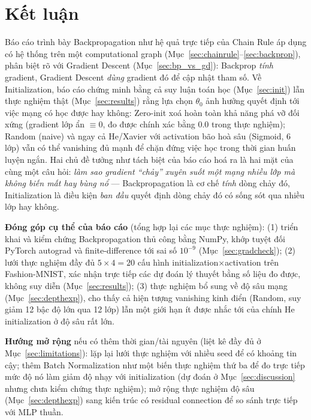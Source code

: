 \documentclass[12pt,a4paper]{article}
\begin{document}
\section{Kết luận}

Báo cáo trình bày Backpropagation như hệ quả trực tiếp của Chain Rule áp
dụng có hệ thống trên một computational graph (Mục~\ref{sec:chainrule}--\ref{sec:backprop}),
phân biệt rõ với Gradient Descent (Mục~\ref{sec:bp_vs_gd}): Backprop
\emph{tính} gradient, Gradient Descent \emph{dùng} gradient đó để cập nhật
tham số. Về Initialization, báo cáo chứng minh bằng cả suy luận toán học
(Mục~\ref{sec:init}) lẫn thực nghiệm thật (Mục~\ref{sec:results}) rằng lựa
chọn $\theta_0$ ảnh hưởng quyết định tới việc mạng có học được hay không:
Zero-init xoá hoàn toàn khả năng phá vỡ đối xứng (gradient lớp ẩn $\equiv0$,
đo được chính xác bằng $0.0$ trong thực nghiệm); Random (naive) và ngay
cả He/Xavier với activation bão hoà sâu (Sigmoid, 6 lớp) vẫn có thể
vanishing đủ mạnh để chặn đứng việc học trong thời gian huấn luyện ngắn.
Hai chủ đề tưởng như tách biệt của báo cáo hoá ra là hai mặt của cùng một
câu hỏi: \emph{làm sao gradient ``chảy'' xuyên suốt một mạng nhiều lớp mà
không biến mất hay bùng nổ} --- Backpropagation là cơ chế \emph{tính}
dòng chảy đó, Initialization là điều kiện \emph{ban đầu} quyết định dòng
chảy đó có sống sót qua nhiều lớp hay không.

\textbf{Đóng góp cụ thể của báo cáo} (tổng hợp lại các mục thực nghiệm):
(1) triển khai và kiểm chứng Backpropagation thủ công bằng NumPy, khớp
tuyệt đối PyTorch autograd và finite-difference tới sai số $10^{-9}$
(Mục~\ref{sec:gradcheck}); (2) lưới thực nghiệm đầy đủ $5\times4=20$ cấu
hình initialization$\times$activation trên Fashion-MNIST, xác nhận trực
tiếp các dự đoán lý thuyết bằng số liệu đo được, không suy diễn
(Mục~\ref{sec:results}); (3) thực nghiệm bổ sung về độ sâu mạng
(Mục~\ref{sec:depthexp}), cho thấy cả hiện tượng vanishing kinh điển
(Random, suy giảm 12 bậc độ lớn qua 12 lớp) lẫn một giới hạn ít được nhắc
tới của chính He initialization ở độ sâu rất lớn.

\textbf{Hướng mở rộng} nếu có thêm thời gian/tài nguyên (liệt kê đầy đủ ở
Mục~\ref{sec:limitations}): lặp lại lưới thực nghiệm với nhiều seed để có
khoảng tin cậy; thêm Batch Normalization như một biến thực nghiệm thứ ba
để đo trực tiếp mức độ nó làm giảm độ nhạy với initialization (dự đoán ở
Mục~\ref{sec:discussion} nhưng chưa kiểm chứng thực nghiệm); mở rộng thực
nghiệm độ sâu (Mục~\ref{sec:depthexp}) sang kiến trúc có residual
connection để so sánh trực tiếp với MLP thuần.
\end{document}
